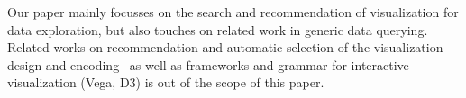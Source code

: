 \par Our paper mainly focusses on the search and recommendation of visualization for data exploration, but also touches on related work in generic data querying. Related works on recommendation and automatic selection of the visualization design and encoding~\cite{Wongsuphasawat2017,Mackinlay2007} as well as frameworks and grammar for interactive visualization (Vega, D3) is out of the scope of this paper.


